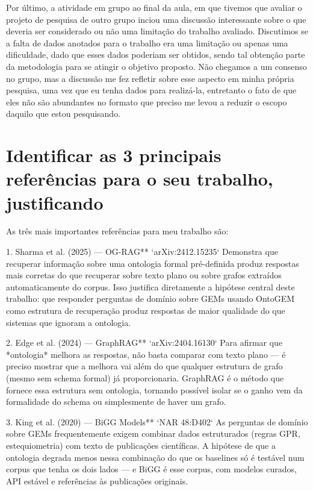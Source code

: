 \documentclass{article}
\begin{document}
Por último, a atividade em grupo ao final da aula, em que tivemos que avaliar o projeto de pesquisa de outro grupo inciou uma discussão interessante sobre o que deveria ser considerado ou não uma limitação do trabalho avaliado. Discutimos se a falta de dados anotados para o trabalho era uma limitação ou apenas uma dificuldade, dado que esses dados poderiam ser obtidos, sendo tal obtenção parte da metodologia para se atingir o objetivo proposto. Não chegamos a um consenso no grupo, mas a discussão me fez refletir sobre esse aspecto em minha própria pesquisa, uma vez que eu tenha dados para realizá-la, entretanto o fato de que eles não são abundantes no formato que preciso me levou a reduzir o escopo daquilo que estou pesquisando.


\section*{Identificar as 3 principais referências para o seu trabalho, justificando}

As três mais importantes referências para meu trabalho são:

1. Sharma et al. (2025) — OG-RAG** `arXiv:2412.15235`
Demonstra que recuperar informação sobre uma ontologia formal pré-definida produz respostas mais corretas do que recuperar sobre texto plano ou sobre grafos extraídos automaticamente do corpus. Isso justifica diretamente a hipótese central deste trabalho: que responder perguntas de domínio sobre GEMs usando OntoGEM como estrutura de recuperação produz respostas de maior qualidade do que sistemas que ignoram a ontologia.

2. Edge et al. (2024) — GraphRAG** `arXiv:2404.16130`
Para afirmar que *ontologia* melhora as respostas, não basta comparar com texto plano — é preciso mostrar que a melhora vai além do que qualquer estrutura de grafo (mesmo sem schema formal) já proporcionaria. GraphRAG é o método que fornece essa estrutura sem ontologia, tornando possível isolar se o ganho vem da formalidade do schema ou simplesmente de haver um grafo.

3. King et al. (2020) — BiGG Models** `NAR 48:D402`
As perguntas de domínio sobre GEMs frequentemente exigem combinar dados estruturados (regras GPR, estequiometria) com texto de publicações científicas. A hipótese de que a ontologia degrada menos nessa combinação do que os baselines só é testável num corpus que tenha os dois lados — e BiGG é esse corpus, com modelos curados, API estável e referências às publicações originais.
\end{document}

